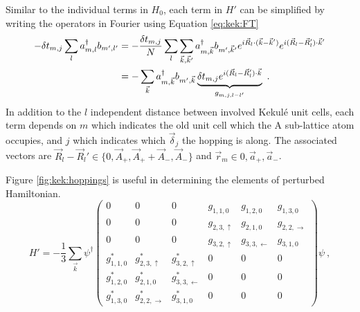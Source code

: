 Similar to the individual terms in $H_0$, each term in $H'$ can be simplified by writing the operators in Fourier using Equation \ref{eq:kek:FT} 
\begin{align*}
	-  \delta t_{m,j} \sum_{l} a^{\dagger}_{m,l} b_{m',l'} &= 
	    -\frac{\delta t_{m,j}}{N}\sum_l \sum_{\vec{k},\vec{k}'} a^{\dagger}_{m,\vec{k}} b_{m',\vec{k}'} 
	    e^{i \vec{R}_l \cdot (\vec{k}-\vec{k}')} e^{i(\vec{R}_l-\vec{R}_l')\cdot \vec{k}'} \\
	    &=- \sum_{\vec{k}} a^{\dagger}_{m,\vec{k}} b_{m',\vec{k}} 
	    	\underbrace{ \delta t_{m,j}  e^{i(\vec{R}_l-\vec{R}_l')\cdot \vec{k}}}_{g_{m,j,l-l'}} \ .
\end{align*}
In addition to the $l$ independent distance between involved Kekul\'e unit cells, each term depends on $m$ which indicates the old unit cell which the A sub-lattice atom occupies, and $j$ which indicates which $\vec{\delta}_j$ the hopping is along.
The associated vectors are $\vec{R}_l-\vec{R}_l' \in \{ 0, \vec{A}_+, \vec{A}_+ +\vec{A}_-,\vec{A}_- \}$ and $\vec{r}_m \in {0, \vec{a}_+,\vec{a}_-}$.

Figure \ref{fig:kek:hoppings} is useful in determining the elements of perturbed Hamiltonian.
\begin{equation*}
	H'=-\frac{1}{3} \sum_{\vec{k}} \psi^{\dagger} 
	\left(\begin{array}{cccccc}
		0           & 0                     & 0                    & g_{1,1,0}        & g_{1,2,0}          & g_{1,3,0} \\
		0           & 0                     & 0                    & g_{2,3,\uparrow} & g_{2,1,0}          & g_{2,2,\rightarrow} \\
		0           & 0                     & 0                    & g_{3,2,\uparrow} & g_{3,3,\leftarrow} & g_{3,1,0} \\
		g_{1,1,0}^* & g_{2,3,\uparrow}^*    & g_{3,2,\uparrow}^*   & 0            & 0              & 0 \\
		g_{1,2,0}^* & g_{2,1,0}^*           & g_{3,3,\leftarrow}^* & 0            & 0              & 0 \\
		g_{1,3,0}^* & g_{2,2,\rightarrow}^* & g_{3,1,0}^*          & 0            & 0              & 0 
	\end{array}\right)
	\psi \ ,
\end{equation*}

